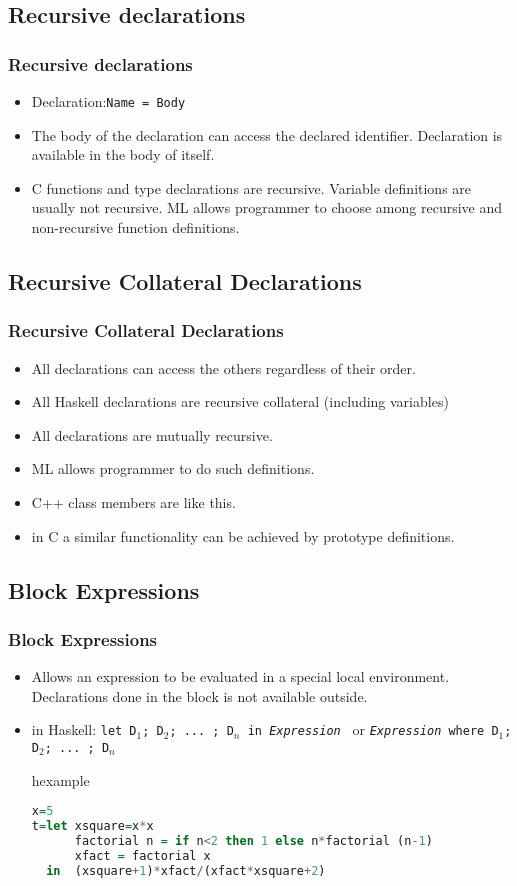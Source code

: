 \subsection{Recursive declarations}
\begin{frame}
\frametitle{Recursive declarations}
\begin{itemize}
 \item Declaration:\texttt{Name = Body}
 \item The body of the declaration can access the declared identifier. Declaration is available
 in the body of itself.
 \item C functions and type declarations are recursive. Variable definitions are usually not
 recursive. ML allows programmer to choose among recursive and non-recursive
 function definitions.
\end{itemize}
\end{frame}

\subsection{Recursive Collateral Declarations}
\begin{frame}
\frametitle{Recursive Collateral Declarations}
\begin{itemize}
 \item All declarations can access the others regardless of their order.
 \item All Haskell declarations are recursive collateral (including variables)
 \item All declarations are mutually recursive.
 \item ML allows programmer to do such definitions.
 \item C++ class members are like this.
 \item in C a similar functionality can be achieved by prototype definitions.
\end{itemize}
\end{frame}

\subsection{Block Expressions}
\begin{frame}[fragile]
\frametitle{Block Expressions}
\begin{itemize}
 \item Allows an expression to be evaluated in a special local environment. Declarations done
 in the block is not available outside.
 \item in Haskell: \texttt{let D$_1$; D$_2$;  ... ; D$_n$ in {\em Expression\/} } or
 \texttt{{\em Expression\/} where D$_1$; D$_2$;  ... ; D$_n$} 
\begin{beamercolorbox}{hexample}
\begin{lstlisting}[language={Haskell},escapechar=\#]
x=5
t=let xsquare=x*x
      factorial n = if n<2 then 1 else n*factorial (n-1)
      xfact = factorial x
  in  (xsquare+1)*xfact/(xfact*xsquare+2)
\end{lstlisting}\end{beamercolorbox}
\end{itemize}
\end{frame}

